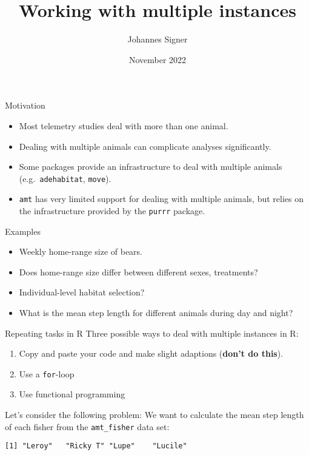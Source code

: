 \documentclass[ignorenonframetext,,t]{beamer}
\title{Working with multiple instances}
\author{Johannes Signer}
\date{November 2022}
\let\oldtextbf\textbf
\renewcommand{\textbf}[1]{\textcolor{spamwell}{\oldtextbf{#1}}}
\providecommand{\tightlist}{%
\setlength{\itemsep}{0pt}\setlength{\parskip}{0pt}}
\newenvironment{Shaded}{\begin{snugshade}}{\end{snugshade}}
\newcommand{\FunctionTok}[1]{\textcolor[rgb]{0.00,0.00,0.00}{#1}}
\newcommand{\NormalTok}[1]{#1}
\newcommand{\SpecialCharTok}[1]{\textcolor[rgb]{0.00,0.00,0.00}{#1}}
\providecommand{\tightlist}{%
\setlength{\itemsep}{0pt}\setlength{\parskip}{0pt}}
\renewcommand{\tightlist}{\setlength{\itemsep}{1.4ex}\setlength{\parskip}{0pt}}
\begin{document}
\frame{\titlepage}



\begin{frame}[fragile]{Motivation}
\protect\hypertarget{motivation}{}
\begin{itemize}
\tightlist
\item
  Most telemetry studies deal with more than one animal.
\item
  Dealing with multiple animals can complicate analyses significantly.
\item
  Some packages provide an infrastructure to deal with multiple animals
  (e.g.~\texttt{adehabitat}, \texttt{move}).
\item
  \texttt{amt} has very limited support for dealing with multiple
  animals, but relies on the infrastructure provided by the
  \texttt{purrr} package.
\end{itemize}
\end{frame}

\begin{frame}{Examples}
\protect\hypertarget{examples}{}
\begin{itemize}
\tightlist
\item
  Weekly home-range size of bears.
\item
  Does home-range size differ between different sexes, treatments?
\item
  Individual-level habitat selection?
\item
  What is the mean step length for different animals during day and
  night?
\end{itemize}
\end{frame}

\begin{frame}[fragile]{Repeating tasks in R}
\protect\hypertarget{repeating-tasks-in-r}{}
Three possible ways to deal with multiple instances in R:

\begin{enumerate}
\tightlist
\item
  Copy and paste your code and make slight adaptions (\textbf{don't do
  this}).
\item
  Use a \texttt{for}-loop
\item
  Use functional programming
\end{enumerate}
\end{frame}

\begin{frame}[fragile]
Let's consider the following problem: We want to calculate the mean step
length of each fisher from the \texttt{amt\_fisher} data set:

\begin{Shaded}
\end{Shaded}

\begin{verbatim}
[1] "Leroy"   "Ricky T" "Lupe"    "Lucile" 
\end{verbatim}
\end{frame}
\end{document}
